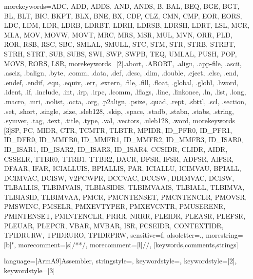  {
  morekeywords={ADC, ADD, ADDS, AND, ANDS, B, BAL, BEQ, BGE, BGT, BL, BLT, BIC, BKPT, BLX, BNE, BX, CDP, CLZ, CMN, CMP, EOR,
  EORS, LDC, LDM, LDR, LDRB, LDRBT, LDRH, LDRSB, LDRSH, LDRT, LSL, MCR, MLA, MOV, MOVW, MOVT, MRC, MRS, MSR, MUL, MVN, ORR, PLD,
  ROR, RSB, RSC, SBC, SMLAL, SMULL, STC, STM, STR, STRB, STRBT, STRH, STRT, SUB, SUBS, SWI, SWP, SWPB, TEQ, UMLAL,
  PUSH, POP, MOVS, RORS, LSR},
  morekeywords=[2]{.abort, .ABORT, .align, .app-file, .ascii, .asciz, .balign, .byte, .comm, .data, .def,
  .desc, .dim, .double, .eject, .else, .end, .endef, .endif, .equ, .equiv, .err, .extern, .file, .fill, .float,
  .global, .globl, .hword, .ident, .if, .include, .int, .irp, .irpc, .lcomm, .lflags, .line, .linkonce, .ln,
  .list, .long, .macro, .mri, .nolist, .octa, .org, .p2align, .psize, .quad, .rept, .sbttl, .scl, .section,
  .set, .short, .single, .size, .sleb128, .skip, .space, .stadb, .stabn, .stabs, .string, .symver, .tag,
  .text, .title, .type, .val, .vectors, .uleb128, .word},
  morekeywords=[3]{SP, PC, MIDR, CTR, TCMTR, TLBTR, MPIDR, ID_PFR0, ID_PFR1, ID_DFR0, ID_MMFR0, ID_MMFR1, ID_MMFR2,
  ID_MMFR3, ID_ISAR0, ID_ISAR1, ID_ISAR2, ID_ISAR3, ID_ISAR4, CCSIDR, CLIDR, AIDR, CSSELR, TTBR0, TTRB1, TTBR2, DACR,
  DFSR, IFSR, ADFSR, AIFSR, DFAAR, IFAR, ICIALLUIS, BPIALLIS, PAR, ICIALLU, ICIMVAU, BPIALL, DCIMVAC, DCISW, V2PCWPR,
  DCCVAC, DCCSW, DDIMVAC, DCISW, TLBALLIS, TLBIMVAIS, TLBIASIDIS, TLBIMVAAIS, TLBIALL, TLBIMVA, TLBIASID, TLBIMVAA,
  PMCR, PMCNTENSET, PMCNTENCLR, PMOVSR, PMSWINC, PMSELR, PMXEVTYPER, PMXEVCNTR, PMUSERENR, PMINTENSET, PMINTENCLR,
  PRRR, NRRR, PLEIDR, PLEASR, PLEFSR, PLEUAR, PLEPCR, VBAR, MVBAR, ISR, FCSEIDR, CONTEXTIDR, TPIDRURW, TPIDRURO, TPIDRPRW},
  sensitive=f,
  alsoletter=.,
  morestring=[b]",
  morecomment=[s]{/*}{*/},
  morecomment=[l]{//},
}[keywords,comments,strings]
   
   
   
 {
  language=[ArmA9]{Assembler},
  stringstyle=\color{armStringColour},
  keywordstyle=\color{armInstructionColour},
  keywordstyle=[2]\color{armDirectiveColour},
  keywordstyle=[3]\itshape\color{armSpecialRegColour}
}

